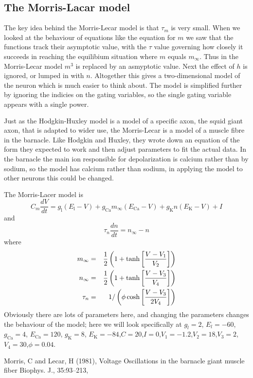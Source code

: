 \documentclass[11pt,a4paper]{scrartcl}
\begin{document}
\subsection*{The Morris-Lacar model}

The key idea behind the Morris-Lecar model \cite{MorrisLecar1981} is that $\tau_m$ is very
small. When we looked at the behaviour of equations like the equation
for $m$ we saw that the functions track their asymptotic value, with
the $\tau$ value governing how closely it succeeds in reaching the
equilibium situation where $m$ equals $m_\infty$. Thus in the
Morris-Lecar model $m^3$ is replaced by an asmyptotic value. Next the
effect of $h$ is ignored, or lumped in with $n$. Altogether this gives
a two-dimensional model of the neuron which is much easier to think
about.  The model is simplified further by ignoring the indicies on
the gating variables, so the single gating variable appears with a
single power.

Just as the Hodgkin-Huxley model is a model of a specific axon, the
squid giant axon, that is adapted to wider use, the Morris-Lecar is a
model of a muscle fibre in the barnacle. Like Hodgkin and Huxley, they
wrote down an equation of the form they expected to work and then
adjust parameters to fit the actual data. In the barnacle the main ion
responsible for depolarization is calcium rather than by sodium, so
the model has calcium rather than sodium, in applying the model to
other neurons this could be changed.

The Morris-Lacer model is
\begin{equation}
C_m\frac{dV}{dt}=g_{\text{l}} (E_{\text{l}}-V)+g_{\text{Ca}}m_\infty(E_{\text{Ca}} -V)+g_{\text{K}}n(E_{\text{K}} -V)+I
\end{equation}
and
\begin{equation}
\tau_n\frac{dn}{dt}=n_\infty-n
\end{equation}
where
\begin{eqnarray}
m_\infty&=&\frac{1}{2}\left(1+\tanh\left[\frac{V-V_1}{V_2}\right]\right)\cr
n_\infty&=&\frac{1}{2}\left(1+\tanh\left[\frac{V-V_3}{V_4}\right]\right)\cr
\tau_n&=&1/\left(\phi\cosh\left[\frac{V-V_3}{2V_4}\right]\right)
\end{eqnarray}
Obviously there are lots of parameters here, and changing the
parameters changes the behaviour of the model; here we will look specifically at $g_l= 2$, $E_l=-60$, 
$g_{\text{Ca}}=4$, $E_{\text{Ca}}= 120$, $g_{\text{K}}= 8$, $E_{\text{K}}=-84$,$C= 20$,$I= 0$,$V_1=-1.2$,$V_2= 18$,$V_3= 2$,$V_4= 30$,$\phi= 0.04$.






\begin{thebibliography}{99}
\newblock Morris, C and Lecar, H (1981),
\newblock Voltage Oscillations in the barnacle giant muscle fiber
\newblock Biophys. J., 35:93--213,
\end{thebibliography}
\end{document}
